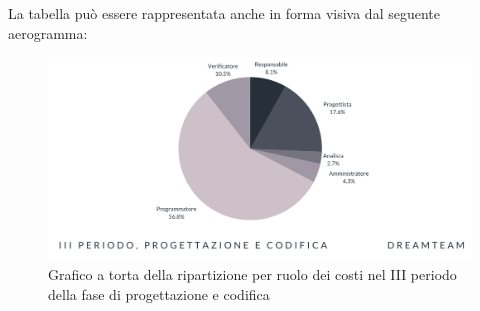 La tabella può essere rappresentata anche in forma visiva dal seguente aerogramma:
\begin{figure}[!h]
\centering
\includegraphics[scale=0.65]{Sezioni/SezioniPreventivo/grafici/Progettazione_III_periodo_costi.png}
\caption{Grafico a torta della ripartizione per ruolo dei costi nel III periodo della fase di progettazione e codifica}
\end{figure}



